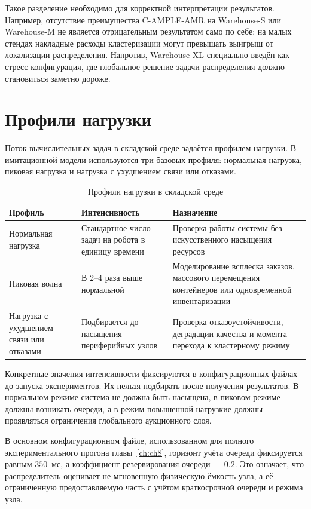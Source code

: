 Такое разделение необходимо для корректной интерпретации результатов. Например, отсутствие преимущества C-AMPLE-AMR на Warehouse-S или Warehouse-M не является отрицательным результатом само по себе: на малых стендах накладные расходы кластеризации могут превышать выигрыш от локализации распределения. Напротив, Warehouse-XL специально введён как стресс-конфигурация, где глобальное решение задачи распределения должно становиться заметно дороже.

\section{Профили нагрузки}

Поток вычислительных задач в складской среде задаётся профилем нагрузки. В имитационной модели используются три базовых профиля: нормальная нагрузка, пиковая нагрузка и нагрузка с ухудшением связи или отказами.

\begin{table}[h]
	\centering
	\small
	\caption{Профили нагрузки в складской среде}
	\label{tab:ch6_load_profiles}
	\begin{tabular}{|p{}|p{}|p{}|}
		\hline
		\textbf{Профиль} & \textbf{Интенсивность} & \textbf{Назначение} \\
		\hline
		Нормальная нагрузка & Стандартное число задач на робота в единицу времени & Проверка работы системы без искусственного насыщения ресурсов \\
		\hline
		Пиковая волна & В 2--4 раза выше нормальной & Моделирование всплеска заказов, массового перемещения контейнеров или одновременной инвентаризации \\
		\hline
		Нагрузка с ухудшением связи или отказами & Подбирается до насыщения периферийных узлов & Проверка отказоустойчивости, деградации качества и момента перехода к кластерному режиму \\
		\hline
	\end{tabular}
\end{table}

Конкретные значения интенсивности фиксируются в конфигурационных файлах до запуска экспериментов. Их нельзя подбирать после получения результатов. В нормальном режиме система не должна быть насыщена, в пиковом режиме должны возникать очереди, а в режим повышенной нагрузкие должны проявляться ограничения глобального аукционного слоя.

В основном конфигурационном файле, использованном для полного экспериментального прогона главы~\ref{ch:ch8}, горизонт учёта очереди фиксируется равным $350$~мс, а коэффициент резервирования очереди --- $0.2$. Это означает, что распределитель оценивает не мгновенную физическую ёмкость узла, а её ограниченную предоставляемую часть с учётом краткосрочной очереди и режима узла.

